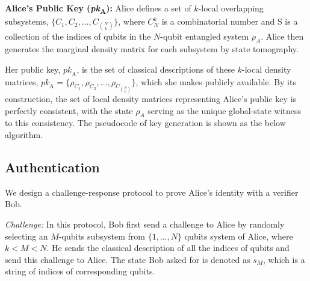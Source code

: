 \documentclass[a0,portrait]{a0poster}
\theoremstyle{definition}
\begin{document}
\begin{multicols}{2}
\textbf{Alice's Public Key (\textit{pk}\textsubscript{A}):}  
Alice defines a set of $k$-local overlapping subsystems, $\{C_1,C_2,\ldots ,C_{\binom{N}{k}}\}$, where $C_N^k$ is a combinatorial number and S is a collection of the indices of qubits in the $N$-qubit entangled system $\rho_A$. Alice then generates the marginal density matrix for each subsystem by state tomography. 

Her public key, $\textit{pk}_\text{A}$, is the set of classical descriptions of these $k$-local density matrices,
$\textit{pk}_\text{A}= \{\rho_{C_1},\rho_{C_2},\ldots ,\rho_{C_{\binom{N}{k}}}\}$, which she makes publicly available. By its construction, the set of local density matrices representing Alice's public key is perfectly consistent, with the state $\rho_A$ serving as the unique global-state witness to this consistency. The pseudocode of key generation is shown as the below algorithm.




\subsection*{Authentication %
}

We design a challenge-response protocol to prove Alice's identity with a verifier Bob. 

\textit{Challenge:}  
In this protocol, Bob first send a challenge to Alice by randomly selecting an $M$-qubits subsystem from $\{1,\ldots ,N\}$ qubits system of Alice, where $k<M<N$. He sends the classical description of all the indices of qubits and send this challenge to Alice. The state Bob asked for is denoted as $s_M$, which is a string of indices of corresponding qubits. 


\end{multicols}
\end{document}
